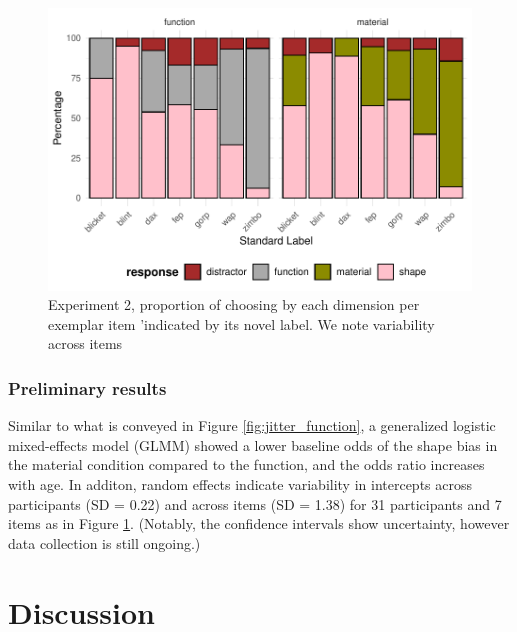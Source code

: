 \documentclass[10pt, letterpaper]{article}
\newenvironment{CodeChunk}{}{}
\begin{document}
\begin{CodeChunk}
\begin{figure}[tb]
\includegraphics[width=1\linewidth]{figs/sec_exp_stim-1} \caption[Experiment 2, proportion of choosing by each dimension per exemplar item 'indicated by its novel label]{Experiment 2, proportion of choosing by each dimension per exemplar item 'indicated by its novel label. We note variability across items}\label{fig:sec_exp_stim}
\end{figure}
\end{CodeChunk}

\hypertarget{preliminary-results}{%
\subsubsection{Preliminary results}\label{preliminary-results}}

Similar to what is conveyed in Figure \ref{fig:jitter_function}, a
generalized logistic mixed-effects model (GLMM) showed a lower baseline
odds of the shape bias in the material condition compared to the
function, and the odds ratio increases with age. In additon, random
effects indicate variability in intercepts across participants (SD =
0.22) and across items (SD = 1.38) for 31 participants and 7 items as in
Figure \ref{fig:sec_exp_stim}. (Notably, the confidence intervals show
uncertainty, however data collection is still ongoing.)

\hypertarget{discussion}{%
\section{Discussion}\label{discussion}}
\end{document}
